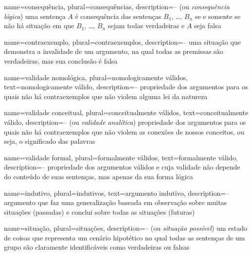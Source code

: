 {
 name=consequência,
 plural=consequências,
 description={-- (ou \textit{consequência lógica}) uma sentença $A$ é consequência das sentenças $B_1$, \dots, $B_n$ se e somente se não há situação em que $B_1$, \dots, $B_n$ sejam todas verdadeiras e $A$ seja falsa}
}

{
 name=contraexemplo,
 plural=contraexemplos,
 description={-- uma situação que demonstra a invalidade de um argumento, na qual todas as premissas são verdadeiras, mas sua conclusão é falsa}
}

{
 name=validade nomológica,
 plural=nomologicamente válidos,
 text=nomologicamente válido,
 description={-- propriedade dos argumentos para os quais não há contraexemplos que não violem alguma lei da natureza}
}

{
 name=validade conceitual,
 plural=conceitualmente válidos,
 text=conceitualmente válido,
 description={-- (ou \textit{validade analítica}) propriedade dos argumentos para os quais não há contraexemplos que não violem as conexões de nossos conceitos, ou seja, o significado das palavras}
}

{
 name=validade formal,
 plural=formalmente válidos,
 text=formalmente válido,
 description={-- propriedade dos argumentos válidos e cuja validade não depende do conteúdo de suas sentenças, mas apenas da sua forma lógica}
}

{
 name=indutivo,
 plural=indutivos,
 text=argumento indutivo,
 description={-- argumento que faz uma generalização baseada em observação sobre muitas situações (passadas) e conclui sobre todas as situações (futuras)}
}


{
 name=situação,
 plural=situações,
 description={-- (ou \textit{situação possível}) um estado de coisas que representa um cenário hipotético no qual todas as sentenças de um grupo são claramente identificáveis como verdadeiras ou falsas}
}